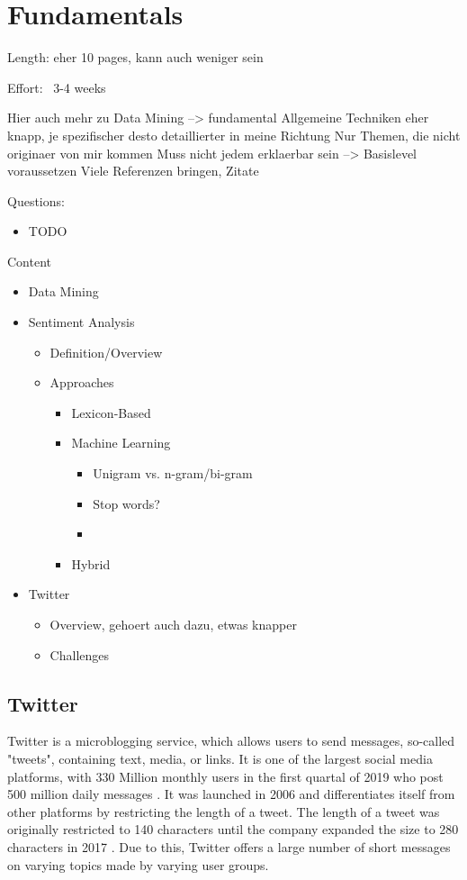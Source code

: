 \chapter{Fundamentals}
\label{cha:Chapter3_Fundamentals}

Length: eher 10 pages, kann auch weniger sein

Effort: ~3-4 weeks

Hier auch mehr zu Data Mining --> fundamental
Allgemeine Techniken eher knapp, je spezifischer desto detaillierter in meine Richtung
Nur Themen, die nicht originaer von mir kommen
Muss nicht jedem erklaerbar sein --> Basislevel voraussetzen
Viele Referenzen bringen, Zitate

Questions:
\begin{itemize}
\item TODO
\end{itemize}

Content
\begin{itemize}
\item Data Mining
\item Sentiment Analysis
\begin{itemize}
\item Definition/Overview
\item Approaches
\begin{itemize}
\item Lexicon-Based
\item Machine Learning \begin{itemize}
    \item Unigram vs. n-gram/bi-gram
    \item Stop words?
    \item 
\end{itemize}
\item Hybrid
\end{itemize}
\end{itemize}
\item Twitter
\begin{itemize}
\item Overview, gehoert auch dazu, etwas knapper
\item Challenges
\end{itemize}
\end{itemize}
\section{Twitter}
Twitter is a microblogging service, which allows users to send messages, so-called "tweets", containing text, media, or links. It is one of the largest social media platforms, with 330 Million monthly users in the first quartal of 2019 who post 500 million daily messages \cite{twitter:users}. It was launched in 2006 and differentiates itself from other platforms by restricting the length of a tweet. The length of a tweet was originally restricted to 140 characters until the company expanded the size to 280 characters in 2017 \cite{twitter:characters}. Due to this, Twitter offers a large number of short messages on varying topics made by varying user groups. 

